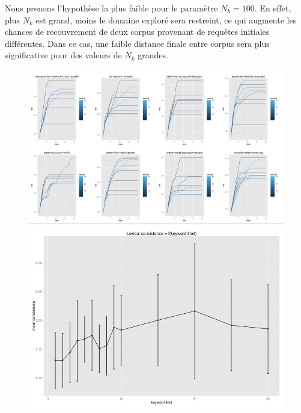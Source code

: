 Nous prenons l'hypothèse la plus faible pour le paramètre $N_k=100$. En effet, plus $N_k$ est grand, moins le domaine exploré sera restreint, ce qui augmente les chances de recouvrement de deux corpus provenant de requêtes initiales différentes. Dans ce cas, une faible distance finale entre corpus sera plus significative pour des valeurs de $N_k$ grandes.


\begin{figure}
\includegraphics[width=\linewidth,height=0.85\textheight]{Figures/Final/A-quantepistemo-sensitivity-algosr.jpg}

\end{figure}
